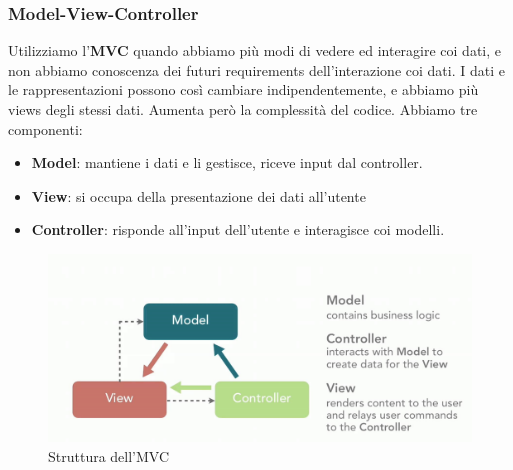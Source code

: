 \documentclass[11pt]{article}
\begin{document}
\subsubsection{Model-View-Controller}
Utilizziamo l'\textbf{MVC} quando abbiamo più modi di vedere ed interagire coi dati, e non abbiamo conoscenza dei futuri requirements dell'interazione coi dati. I dati e le rappresentazioni possono così cambiare indipendentemente, e abbiamo più views degli stessi dati. Aumenta però la complessità del codice. Abbiamo tre componenti:
\begin{itemize}
    \item \textbf{Model}: mantiene i dati e li gestisce, riceve input dal controller.
    \item \textbf{View}: si occupa della presentazione dei dati all'utente
    \item \textbf{Controller}: risponde all'input dell'utente e interagisce coi modelli.
\end{itemize}
\begin{figure}[H]
    \includegraphics[width=\linewidth]{res/teoria/MVC.png}
    \caption{Struttura dell'MVC}
\end{figure}
\end{document}
